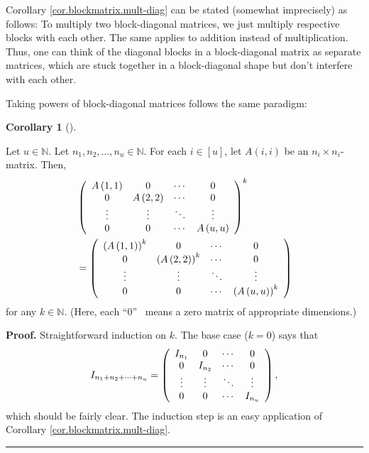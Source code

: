 \documentclass[numbers=enddot,12pt,final,onecolumn,notitlepage]{scrartcl}%
\numberwithin{exer}{subsection}
\theoremstyle{definition}
\newtheorem{coro}[theo]{Corollary}
\newenvironment{corollary}[1][]
{\begin{coro}[#1]\begin{leftbar}}
{\end{leftbar}\end{coro}}
\newenvironment{proof}[1][Proof]{\noindent\textbf{#1.} }{\ \rule{0.5em}{0.5em}}
\begin{document}
Corollary \ref{cor.blockmatrix.mult-diag} can be stated (somewhat imprecisely)
as follows: To multiply two block-diagonal matrices, we just multiply
respective blocks with each other. The same applies to addition instead of
multiplication. Thus, one can think of the diagonal blocks in a block-diagonal
matrix as separate matrices, which are stuck together in a block-diagonal
shape but don't interfere with each other.

Taking powers of block-diagonal matrices follows the same paradigm:

\begin{corollary}
\label{cor.blockmatrix.powt-diag}Let $u\in\mathbb{N}$. Let $n_{1},n_{2}%
,\ldots,n_{u}\in\mathbb{N}$. For each $i\in\left[  u\right]  $, let $A\left(
i,i\right)  $ be an $n_{i}\times n_{i}$-matrix. Then,%
\begin{align*}
&  \left(
\begin{array}
[c]{cccc}%
A\left(  1,1\right)  & 0 & \cdots & 0\\
0 & A\left(  2,2\right)  & \cdots & 0\\
\vdots & \vdots & \ddots & \vdots\\
0 & 0 & \cdots & A\left(  u,u\right)
\end{array}
\right)  ^{k}\\
&  =\left(
\begin{array}
[c]{cccc}%
\left(  A\left(  1,1\right)  \right)  ^{k} & 0 & \cdots & 0\\
0 & \left(  A\left(  2,2\right)  \right)  ^{k} & \cdots & 0\\
\vdots & \vdots & \ddots & \vdots\\
0 & 0 & \cdots & \left(  A\left(  u,u\right)  \right)  ^{k}%
\end{array}
\right)
\end{align*}
for any $k\in\mathbb{N}$. (Here, each \textquotedblleft$0$\textquotedblright%
\ means a zero matrix of appropriate dimensions.)
\end{corollary}

\begin{proof}
Straightforward induction on $k$. The base case ($k=0$) says that%
\[
I_{n_{1}+n_{2}+\cdots+n_{u}}=\left(
\begin{array}
[c]{cccc}%
I_{n_{1}} & 0 & \cdots & 0\\
0 & I_{n_{2}} & \cdots & 0\\
\vdots & \vdots & \ddots & \vdots\\
0 & 0 & \cdots & I_{n_{u}}%
\end{array}
\right)  ,
\]
which should be fairly clear. The induction step is an easy application of
Corollary \ref{cor.blockmatrix.mult-diag}.
\end{proof}
\end{document}
